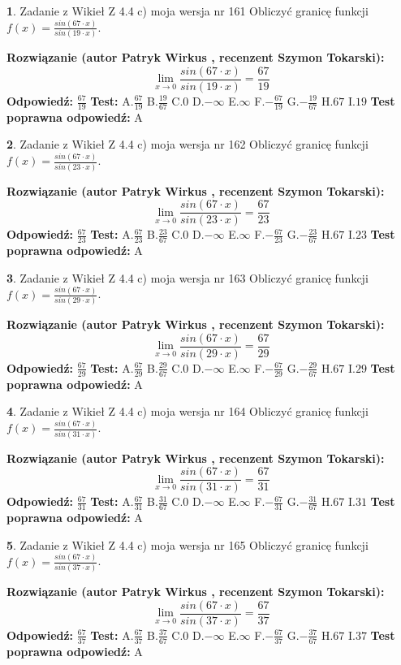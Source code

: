 \documentclass[12pt, a4paper]{article}
\theoremstyle{definition} %
\newtheorem{zad}{}
\newcommand{\zadStart}[1]{\begin{zad}#1\newline}
\newcommand{\zadStop}{\end{zad}}
\newcommand{\rozwStart}[2]{\noindent \textbf{Rozwiązanie (autor #1 , recenzent #2): }\newline}
\newcommand{\rozwStop}{\newline}
\newcommand{\odpStart}{\noindent \textbf{Odpowiedź:}\newline}
\newcommand{\odpStop}{\newline}
\newcommand{\testStart}{\noindent \textbf{Test:}\newline}
\newcommand{\testStop}{\newline}
\newcommand{\kluczStart}{\noindent \textbf{Test poprawna odpowiedź:}\newline}
\newcommand{\kluczStop}{\newline}
\begin{document}
\zadStart{Zadanie z Wikieł Z 4.4 c) moja wersja nr 161}
Obliczyć granicę funkcji $f(x)=\frac{sin(67\cdot x)}{sin(19\cdot x)}$.
\zadStop
\rozwStart{Patryk Wirkus}{Szymon Tokarski}
$$\lim\limits_{x\to 0}\frac{sin(67\cdot x)}{sin(19\cdot x)}=
\frac{67}{19}$$
\rozwStop
\odpStart
$\frac{67}{19}$
\odpStop
\testStart
A.$\frac{67}{19}$
B.$\frac{19}{67}$
C.$0$
D.$-\infty$
E.$\infty$
F.$-\frac{67}{19}$
G.$-\frac{19}{67}$
H.$67$
I.$19$
\testStop
\kluczStart
A
\kluczStop



\zadStart{Zadanie z Wikieł Z 4.4 c) moja wersja nr 162}
Obliczyć granicę funkcji $f(x)=\frac{sin(67\cdot x)}{sin(23\cdot x)}$.
\zadStop
\rozwStart{Patryk Wirkus}{Szymon Tokarski}
$$\lim\limits_{x\to 0}\frac{sin(67\cdot x)}{sin(23\cdot x)}=
\frac{67}{23}$$
\rozwStop
\odpStart
$\frac{67}{23}$
\odpStop
\testStart
A.$\frac{67}{23}$
B.$\frac{23}{67}$
C.$0$
D.$-\infty$
E.$\infty$
F.$-\frac{67}{23}$
G.$-\frac{23}{67}$
H.$67$
I.$23$
\testStop
\kluczStart
A
\kluczStop



\zadStart{Zadanie z Wikieł Z 4.4 c) moja wersja nr 163}
Obliczyć granicę funkcji $f(x)=\frac{sin(67\cdot x)}{sin(29\cdot x)}$.
\zadStop
\rozwStart{Patryk Wirkus}{Szymon Tokarski}
$$\lim\limits_{x\to 0}\frac{sin(67\cdot x)}{sin(29\cdot x)}=
\frac{67}{29}$$
\rozwStop
\odpStart
$\frac{67}{29}$
\odpStop
\testStart
A.$\frac{67}{29}$
B.$\frac{29}{67}$
C.$0$
D.$-\infty$
E.$\infty$
F.$-\frac{67}{29}$
G.$-\frac{29}{67}$
H.$67$
I.$29$
\testStop
\kluczStart
A
\kluczStop



\zadStart{Zadanie z Wikieł Z 4.4 c) moja wersja nr 164}
Obliczyć granicę funkcji $f(x)=\frac{sin(67\cdot x)}{sin(31\cdot x)}$.
\zadStop
\rozwStart{Patryk Wirkus}{Szymon Tokarski}
$$\lim\limits_{x\to 0}\frac{sin(67\cdot x)}{sin(31\cdot x)}=
\frac{67}{31}$$
\rozwStop
\odpStart
$\frac{67}{31}$
\odpStop
\testStart
A.$\frac{67}{31}$
B.$\frac{31}{67}$
C.$0$
D.$-\infty$
E.$\infty$
F.$-\frac{67}{31}$
G.$-\frac{31}{67}$
H.$67$
I.$31$
\testStop
\kluczStart
A
\kluczStop



\zadStart{Zadanie z Wikieł Z 4.4 c) moja wersja nr 165}
Obliczyć granicę funkcji $f(x)=\frac{sin(67\cdot x)}{sin(37\cdot x)}$.
\zadStop
\rozwStart{Patryk Wirkus}{Szymon Tokarski}
$$\lim\limits_{x\to 0}\frac{sin(67\cdot x)}{sin(37\cdot x)}=
\frac{67}{37}$$
\rozwStop
\odpStart
$\frac{67}{37}$
\odpStop
\testStart
A.$\frac{67}{37}$
B.$\frac{37}{67}$
C.$0$
D.$-\infty$
E.$\infty$
F.$-\frac{67}{37}$
G.$-\frac{37}{67}$
H.$67$
I.$37$
\testStop
\kluczStart
A
\kluczStop
\end{document}
